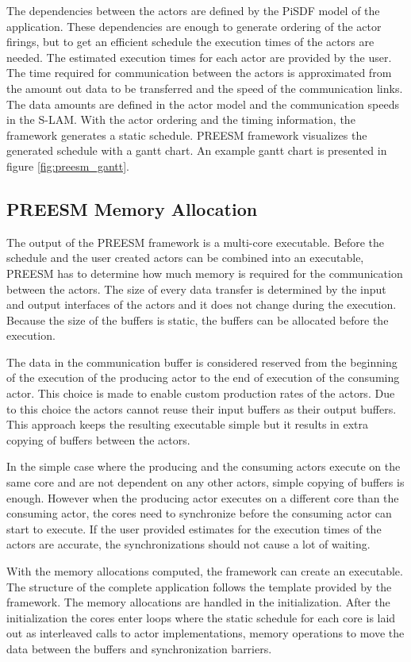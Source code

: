 The dependencies between the actors are defined by the PiSDF model of the application. These dependencies are enough to generate ordering of the actor firings, but to get an efficient schedule the execution times of the actors are needed. The estimated execution times for each actor are provided by the user. The time required for communication between the actors is approximated from the amount out data to be transferred and the speed of the communication links. The data amounts are defined in the actor model and the communication speeds in the S-LAM. With the actor ordering and the timing information, the framework generates a static schedule. \cite{pelcat2014preesm} PREESM framework visualizes the generated schedule with a gantt chart. An example gantt chart is presented in figure \ref{fig:preesm_gantt}.

\subsection{PREESM Memory Allocation}
\label{sec:preesm-codegen}
The output of the PREESM framework is a multi-core executable. Before the schedule and the user created actors can be combined into an executable, PREESM has to determine how much memory is required for the communication between the actors. The size of every data transfer is determined by the input and output interfaces of the actors and it does not change during the execution. Because the size of the buffers is static, the buffers can be allocated before the execution.~\cite{desnos2012memory}

The data in the communication buffer is considered reserved from the beginning of the execution of the producing actor to the end of execution of the consuming actor. This choice is made to enable custom production rates of the actors. Due to this choice the actors cannot reuse their input buffers as their output buffers. \cite{desnos2012memory} This approach keeps the resulting executable simple but it results in extra copying of buffers between the actors.

In the simple case where the producing and the consuming actors execute on the same core and are not dependent on any other actors, simple copying of buffers is enough. However when the producing actor executes on a different core than the consuming actor, the cores need to synchronize before the consuming actor can start to execute. If the user provided estimates for the execution times of the actors are accurate, the synchronizations should not cause a lot of waiting.~\cite{pelcat2014preesm}

With the memory allocations computed, the framework can create an executable. The structure of the complete application follows the template provided by the framework. The memory allocations are handled in the initialization. After the initialization the cores enter loops where the static schedule for each core is laid out as interleaved calls to actor implementations, memory operations to move the data between the buffers and synchronization barriers.

